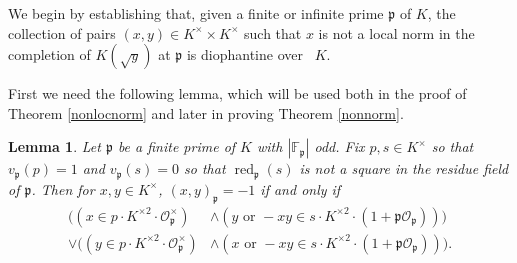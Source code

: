 \documentclass[12pt,reqno]{amsart}
\newcommand{\OO}{\mathcal{O}}
\newcommand{\FF}{\mathbb{F}}
\newcommand{\pp}{\mathfrak{p}}
\DeclareMathOperator{\red}{red}
\newtheorem{lem}[thm]{Lemma}
\theoremstyle{definition}
\begin{document}
We begin by establishing that, given a finite or infinite prime $\pp$ of $K$, the collection of pairs $(x,y)\in K^{\times}\times K^{\times}$ such that $x$ is not a local norm in the completion of $K(\sqrt{y})$ at $\pp$ is diophantine over ~$K$. 

First we need the following lemma, which will be used both in the proof of Theorem \ref{nonlocnorm} and later in proving Theorem \ref{nonnorm}.


\begin{lem}\label{hsodd}
Let $\pp$ be a finite prime of $K$ with $|\FF_{\pp}|$ odd. Fix $p,s\in K^{\times}$ so that $v_{\pp}(p)=1$ and $v_{\pp}(s)=0$ so that $\red_{\pp}(s)$ is not a square in the residue field of $\pp$. Then for $x,y\in K^{\times}$, $(x,y)_{\pp}=-1$ if and only if
\begin{align*}
\big((x\in p\cdot K^{\times2}\cdot\OO_{\pp}^{\times}) &\land (y \text{ or } -xy \in s\cdot K^{\times2}  \cdot(1+\pp\OO_{\pp}))\big) \\ 
\lor \big((y\in p\cdot K^{\times2} \cdot \OO_{\pp}^{\times}) &\land (x \text{ or } -xy \in s\cdot K^{\times2} \cdot(1+\pp\OO_{\pp}))\big).
\end{align*}
\end{lem}
\end{document}
